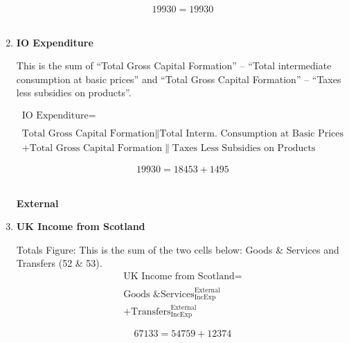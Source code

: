 \begin{enumerate}
\begin{equation} \nonumber
19930 = 19930
\end{equation}\\


\item \textbf {IO Expenditure}

This is the sum of “Total Gross Capital Formation” – “Total intermediate consumption at basic prices” and “Total Gross Capital Formation” – “Taxes less subsidies on products”. \cite{ScotGov2013a}

\begin{equation}
\begin{split}
\text{IO Expenditure} =  \\ \\
\text{Total Gross Capital Formation}\|\text{Total Interm. Consumption at Basic Prices}\\
+\text{Total Gross Capital Formation}\|\text{Taxes Less Subsidies on Products}
\end{split} \label{eq:2.5.54}
\end{equation}

\begin{equation} \nonumber
19930 = 18453+1495
\end{equation}\\



\pagebreak


\begin{center}
\textbf{\LARGE External}
\end{center}

\item \textbf {UK Income from Scotland}

Totals Figure: This is the sum of the two cells below: Goods \& Services and Transfers (52 \& 53).\\

\begin{equation}
\begin{split}
\text{UK Income from Scotland} =  \\ \\
\text{Goods \& Services}^\text{External}_\text{IncExp}\\
+\text{Transfers}^\text{External}_\text{IncExp}
\end{split} \label{eq:2.5.55}
\end{equation}

\begin{equation} \nonumber
67133 = 54759+12374
\end{equation}\\



\end{enumerate}
